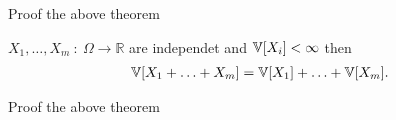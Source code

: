 \begin{exercise}
 Proof the above theorem 
\end{exercise}
\begin{theorem}
  $X_{1},\ldots ,X_m \ : \ \Omega  \to \mathbb{R} $ are independet and $\mathbb{V}[X_i] <\infty$ then 
  \begin{align*}
    \mathbb{V}[X_{1} + \ldots  + X_m] = \mathbb{V}[X_{1}] + \ldots  + \mathbb{V}[X_m]
  .\end{align*}
\end{theorem}
\begin{exercise}
 Proof the above theorem 
\end{exercise}


